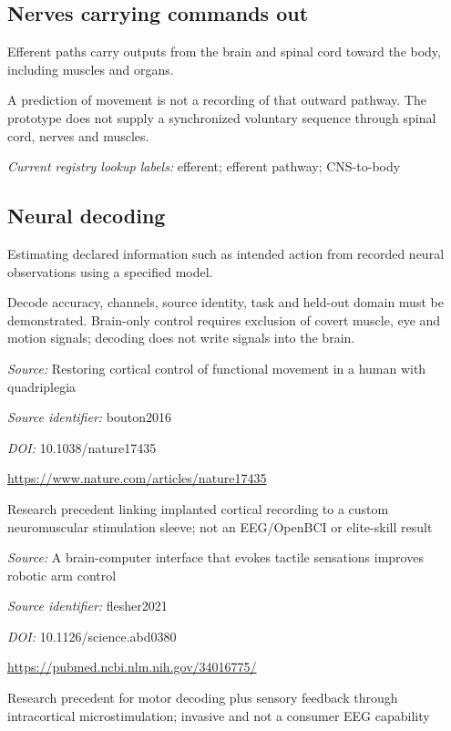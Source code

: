 \begin{samepage}
\subsection*{Nerves carrying commands out}
\noindent Efferent paths carry outputs from the brain and spinal cord toward the body, including muscles and organs.\par
\end{samepage}
\begin{samepage}
\noindent A prediction of movement is not a recording of that outward pathway. The prototype does not supply a synchronized voluntary sequence through spinal cord, nerves and muscles.\par\nopagebreak[4]

\end{samepage}


\noindent\textit{Current registry lookup labels:} efferent; efferent pathway; CNS-to-body\par

\begin{samepage}
\subsection*{Neural decoding}
\noindent Estimating declared information such as intended action from recorded neural observations using a specified model.\par
\end{samepage}
\noindent Decode accuracy, channels, source identity, task and held-out domain must be demonstrated. Brain-only control requires exclusion of covert muscle, eye and motion signals; decoding does not write signals into the brain.\par



\noindent\textit{Source:} Restoring cortical control of functional movement in a human with quadriplegia\par
\noindent\textit{Source identifier:} bouton2016\par
\noindent\textit{DOI:} 10.1038/nature17435\par
\noindent\url{https://www.nature.com/articles/nature17435}\par
\noindent Research precedent linking implanted cortical recording to a custom neuromuscular stimulation sleeve; not an EEG/OpenBCI or elite-skill result\par
\noindent\textit{Source:} A brain-computer interface that evokes tactile sensations improves robotic arm control\par
\noindent\textit{Source identifier:} flesher2021\par
\noindent\textit{DOI:} 10.1126/science.abd0380\par
\noindent\url{https://pubmed.ncbi.nlm.nih.gov/34016775/}\par
\noindent Research precedent for motor decoding plus sensory feedback through intracortical microstimulation; invasive and not a consumer EEG capability\par

